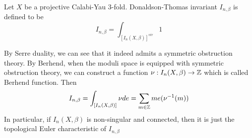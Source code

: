\begin{defin}
    Let $X$ be a projective Calabi-Yau 3-fold. Donaldson-Thomas invariant $I_{n, \beta}$ is defined to be
    \begin{equation*}
        I_{n,\beta}=\int_{[I_n(X,\beta)]^{vir}}1
    \end{equation*}
\end{defin}
\begin{rem}
    By Serre duality, we can see that it indeed admits a symmetric obstruction theory. By Berhend, when the moduli space is equipped with symmetric obstruction theory, we can construct a function $\nu:I_n(X,\beta) \to \mathbb Z$ which is called Berhend function. Then 
    \begin{equation*}
        I_{n,\beta} = \int_{[I_n(X,\beta)]}\nu de =\sum_{m\in \mathbb Z} me(\nu^{-1}(m))
    \end{equation*}
    In particular, if $I_n(X,\beta)$ is non-singular and connected, then it is just the topological Euler characteristic of $I_{n,\beta}$
\end{rem}

